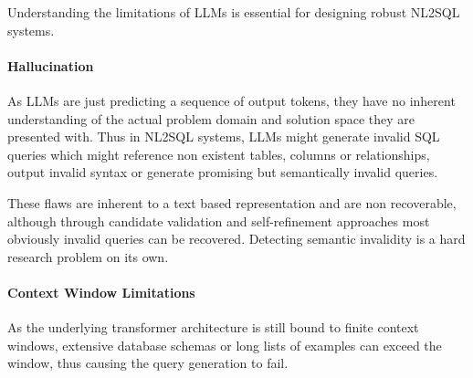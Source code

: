 Understanding the limitations of LLMs is essential for designing robust NL2SQL
systems.

\paragraph{Hallucination}

As LLMs are just predicting a sequence of output tokens, they have no inherent
understanding of the actual problem domain and solution space they are
presented with. Thus in NL2SQL systems, LLMs might generate invalid SQL queries
which might reference non existent tables, columns or relationships, output
invalid syntax or generate promising but semantically invalid queries.

These flaws are inherent to a text based representation and are non
recoverable, although through candidate validation and self-refinement
approaches most obviously invalid queries can be recovered. Detecting semantic
invalidity is a hard research problem on its own.

\paragraph{Context Window Limitations}

As the underlying transformer architecture is still bound to finite context
windows, extensive database schemas or long lists of examples can exceed the
window, thus causing the query generation to fail.

